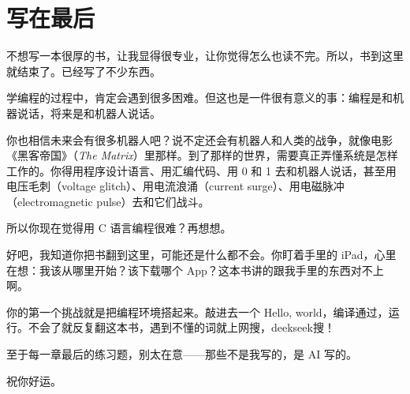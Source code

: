\chapter*{写在最后}

不想写一本很厚的书，让我显得很专业，让你觉得怎么也读不完。所以，书到这里就结束了。已经写了不少东西。

学编程的过程中，肯定会遇到很多困难。但这也是一件很有意义的事：编程是和机器说话，将来是和机器人说话。

你也相信未来会有很多机器人吧？说不定还会有机器人和人类的战争，就像电影《黑客帝国》（\emph{The Matrix}）里那样。到了那样的世界，需要真正弄懂系统是怎样工作的。你得用程序设计语言、用汇编代码、用 0 和 1 去和机器人说话，甚至用电压毛刺（voltage glitch）、用电流浪涌（current surge）、用电磁脉冲（electromagnetic pulse）去和它们战斗。

所以你现在觉得用 C 语言编程很难？再想想。

\bigskip

好吧，我知道你把书翻到这里，可能还是什么都不会。你盯着手里的 iPad，心里在想：我该从哪里开始？该下载哪个 App？这本书讲的跟我手里的东西对不上啊。

你的第一个挑战就是把编程环境搭起来。敲进去一个 Hello, world，编译通过，运行。不会了就反复翻这本书，遇到不懂的词就上网搜，deekseek搜！

\begin{center}
\end{center}

至于每一章最后的练习题，别太在意——那些不是我写的，是 AI 写的。

\vspace{2em}
\begin{flushright}
  {\large 祝你好运。}
\end{flushright}
